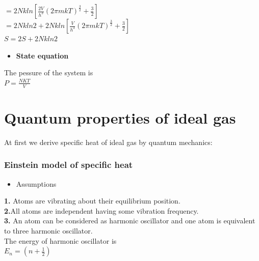 \documentclass{article}
\newcommand*{\1}{\hspace{1pt}}
\begin{document}
$ =  2Nkln[\frac{2V}{h^3}(2\pi mkT)^{\frac{3}{2}}+\frac{3}{2}]$\\

$ =2Nkln2+2Nkln[\frac{V}{h^3}(2\pi mkT)^{\frac{3}{2}}+\frac{3}{2}]$\\


$S= 2S+2Nkln2$\\


    
    






     
\begin{itemize}
    \item \textbf{State equation}
\end{itemize}     

The pessure of the system is\\

$P=\frac{NKT}{V}$\\





\section{Quantum properties of ideal gas}

At first we derive specific heat of ideal gas by quantum mechanics:\\
\subsubsection{Einstein model of specific heat}

\begin{itemize}
    \item Assumptions
\end{itemize}
\textbf{1.} Atoms are vibrating about their equilibrium position.\\

\textbf{2.}All atoms are independent having some vibration frequency.\\

\textbf{3.} An atom can be considered as harmonic oscillator and one atom is equivalent to three harmonic oscillator.\\

The energy of harmonic oscillator is\\

$E_n=(n+\frac{1}{2})$\\
\end{document}
